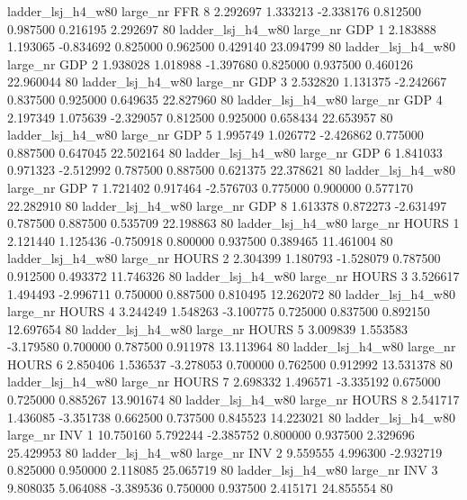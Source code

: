  ladder_lsj_h4_w80   large_nr      FFR                 8  2.292697  1.333213  -2.338176 0.812500 0.987500  0.216195    2.292697 80
  ladder_lsj_h4_w80   large_nr      GDP                 1  2.183888  1.193065  -0.834692 0.825000 0.962500  0.429140   23.094799 80
  ladder_lsj_h4_w80   large_nr      GDP                 2  1.938028  1.018988  -1.397680 0.825000 0.937500  0.460126   22.960044 80
  ladder_lsj_h4_w80   large_nr      GDP                 3  2.532820  1.131375  -2.242667 0.837500 0.925000  0.649635   22.827960 80
  ladder_lsj_h4_w80   large_nr      GDP                 4  2.197349  1.075639  -2.329057 0.812500 0.925000  0.658434   22.653957 80
  ladder_lsj_h4_w80   large_nr      GDP                 5  1.995749  1.026772  -2.426862 0.775000 0.887500  0.647045   22.502164 80
  ladder_lsj_h4_w80   large_nr      GDP                 6  1.841033  0.971323  -2.512992 0.787500 0.887500  0.621375   22.378621 80
  ladder_lsj_h4_w80   large_nr      GDP                 7  1.721402  0.917464  -2.576703 0.775000 0.900000  0.577170   22.282910 80
  ladder_lsj_h4_w80   large_nr      GDP                 8  1.613378  0.872273  -2.631497 0.787500 0.887500  0.535709   22.198863 80
  ladder_lsj_h4_w80   large_nr    HOURS                 1  2.121440  1.125436  -0.750918 0.800000 0.937500  0.389465   11.461004 80
  ladder_lsj_h4_w80   large_nr    HOURS                 2  2.304399  1.180793  -1.528079 0.787500 0.912500  0.493372   11.746326 80
  ladder_lsj_h4_w80   large_nr    HOURS                 3  3.526617  1.494493  -2.996711 0.750000 0.887500  0.810495   12.262072 80
  ladder_lsj_h4_w80   large_nr    HOURS                 4  3.244249  1.548263  -3.100775 0.725000 0.837500  0.892150   12.697654 80
  ladder_lsj_h4_w80   large_nr    HOURS                 5  3.009839  1.553583  -3.179580 0.700000 0.787500  0.911978   13.113964 80
  ladder_lsj_h4_w80   large_nr    HOURS                 6  2.850406  1.536537  -3.278053 0.700000 0.762500  0.912992   13.531378 80
  ladder_lsj_h4_w80   large_nr    HOURS                 7  2.698332  1.496571  -3.335192 0.675000 0.725000  0.885267   13.901674 80
  ladder_lsj_h4_w80   large_nr    HOURS                 8  2.541717  1.436085  -3.351738 0.662500 0.737500  0.845523   14.223021 80
  ladder_lsj_h4_w80   large_nr      INV                 1 10.750160  5.792244  -2.385752 0.800000 0.937500  2.329696   25.429953 80
  ladder_lsj_h4_w80   large_nr      INV                 2  9.559555  4.996300  -2.932719 0.825000 0.950000  2.118085   25.065719 80
  ladder_lsj_h4_w80   large_nr      INV                 3  9.808035  5.064088  -3.389536 0.750000 0.937500  2.415171   24.855554 80
